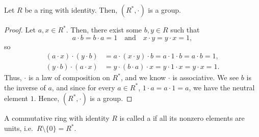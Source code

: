 \begin{prop}
Let $ R $ be a ring with identity. Then, $ (R^*,\cdot) $ is a group.
\end{prop}
\begin{proof}
Let $ a,x\in R^* $. Then, there exist some $ b,y\in R $ such that
\begin{equation*}
    a\cdot b=b\cdot a=1 \quad\text{and}\quad x\cdot y=y\cdot x=1,
\end{equation*}
so
\begin{align*}
    (a\cdot x)\cdot(y\cdot b) &= a\cdot(x\cdot y)\cdot b=a\cdot 1\cdot b=a\cdot b=1, \\
        (y\cdot b)\cdot(a\cdot x) &= y\cdot(b\cdot a)\cdot x=y\cdot 1\cdot x=y\cdot x=1.
\end{align*}
Thus, $ \cdot $ is a law of composition on $ R^* $, and we know $ \cdot $ is associative. We see $ b $ is the inverse of $ a $, and since for every $ a\in R^* $, $ 1\cdot a=a\cdot 1=a $, we have the neutral element $ 1 $. Hence, $ (R^*,\cdot) $ is a group.
\end{proof}

\begin{defn}
A commutative ring with identity $ R $ is called a  if all its nonzero elements are units, i.e.\ $ R\setminus\{0\}=R^* $.
\end{defn}